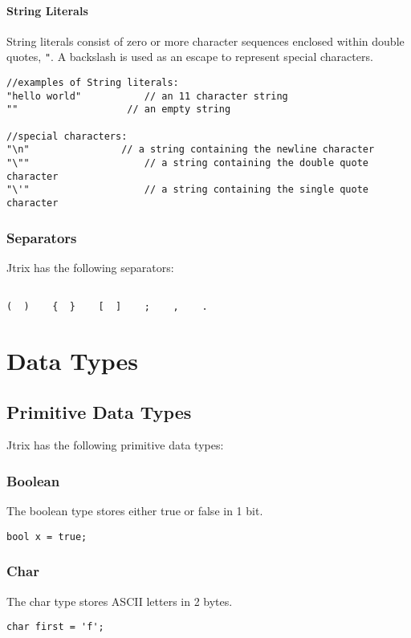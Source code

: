 \documentclass[12pt]{report}
\begin{document}
\subsubsection{String Literals}
String literals consist of zero or more character sequences enclosed within double quotes, \texttt{"}.  A backslash is used as an escape to represent special characters.
\begin{lstlisting}
//examples of String literals:
"hello world"			// an 11 character string
""                   // an empty string

//special characters:
"\n"  				// a string containing the newline character
"\""					// a string containing the double quote character
"\'"					// a string containing the single quote character
\end{lstlisting}
\subsection{Separators}
Jtrix has the following separators:

\begin{lstlisting}

(  )    {  }    [  ]    ;    ,    .
\end{lstlisting}

\chapter{Data Types}

\section{Primitive Data Types}
Jtrix has the following primitive data types:
\subsection{Boolean}
The boolean type stores either true or false in 1 bit.
\begin{lstlisting}
bool x = true;
\end{lstlisting}
\subsection{Char}
The char type stores ASCII letters in 2 bytes.
\begin{lstlisting}
char first = 'f';
\end{lstlisting}
\end{document}
